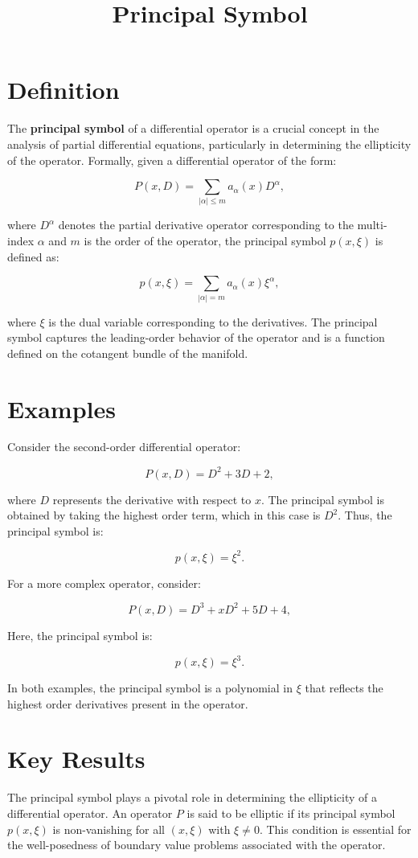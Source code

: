 \documentclass[11pt,a4paper]{article}
\title{Principal Symbol}
\date{}
\begin{document}
\maketitle
\section{Definition}
The \textbf{principal symbol} of a differential operator is a crucial concept in the analysis of partial differential equations, particularly in determining the ellipticity of the operator. Formally, given a differential operator of the form:

$$
P(x, D) = \sum_{|\alpha| \leq m} a_\alpha(x) D^\alpha,
$$

where \(D^\alpha\) denotes the partial derivative operator corresponding to the multi-index \(\alpha\) and \(m\) is the order of the operator, the principal symbol \(p(x, \xi)\) is defined as:

$$
p(x, \xi) = \sum_{|\alpha| = m} a_\alpha(x) \xi^\alpha,
$$

where \(\xi\) is the dual variable corresponding to the derivatives. The principal symbol captures the leading-order behavior of the operator and is a function defined on the cotangent bundle of the manifold.

\section{Examples}
Consider the second-order differential operator:

$$
P(x, D) = D^2 + 3D + 2,
$$

where \(D\) represents the derivative with respect to \(x\). The principal symbol is obtained by taking the highest order term, which in this case is \(D^2\). Thus, the principal symbol is:

$$
p(x, \xi) = \xi^2.
$$

For a more complex operator, consider:

$$
P(x, D) = D^3 + xD^2 + 5D + 4,
$$

Here, the principal symbol is:

$$
p(x, \xi) = \xi^3.
$$

In both examples, the principal symbol is a polynomial in \(\xi\) that reflects the highest order derivatives present in the operator.

\section{Key Results}
The principal symbol plays a pivotal role in determining the ellipticity of a differential operator. An operator \(P\) is said to be elliptic if its principal symbol \(p(x, \xi)\) is non-vanishing for all \((x, \xi)\) with \(\xi \neq 0\). This condition is essential for the well-posedness of boundary value problems associated with the operator.
\end{document}
